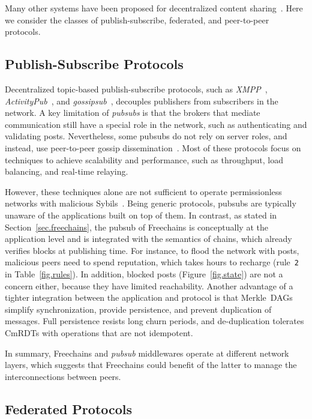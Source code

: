 \documentclass[12pt]{article}
\newcommand{\FC}       {Freechains\xspace}
\newcommand{\code}[1]  {\texttt{\footnotesize{#1}}}
\begin{document}
Many other systems have been proposed for decentralized content
sharing~\cite{p2p.survey,p2p.ecosystem}.
Here we consider the classes of publish-subscribe, federated, and peer-to-peer
protocols.

\subsection{Publish-Subscribe Protocols}

Decentralized topic-based publish-subscribe protocols, such as
    \emph{XMPP}~\cite{pubsub.xmpp},
    \emph{ActivityPub}~\cite{pubsub.activitypub}, and
    \emph{gossipsub}~\cite{pubsub.gossipsub},
decouples publishers from subscribers in the network.
%
A key limitation of \emph{pubsubs} is that the brokers that mediate
communication still have a special role in the network, such as authenticating
and validating posts.
%
Nevertheless, some pubsubs do not rely on server roles, and instead, use
peer-to-peer gossip dissemination~\cite{pubsub.tera,pubsub.rappel,pubsub.stan,pubsub.vitis,pubsub.gossipsub,pubsub.rappel}.
Most of these protocols focus on techniques to achieve scalability and
performance, such as throughput, load balancing, and real-time relaying.

However, these techniques alone are not sufficient to operate permissionless
networks with malicious Sybils~\cite{pubsub.gossipsub2}.
Being generic protocols, pubsubs are typically unaware of the applications
built on top of them.
%
In contrast, as stated in Section~\ref{sec.freechains}, the pubsub of \FC is
conceptually at the application level and is integrated with the semantics of
chains, which already verifies blocks at publishing time.
For instance, to flood the network with posts, malicious peers need to spend
reputation, which takes hours to recharge (rule~\code{2} in
Table~\ref{fig.rules}).
In addition, blocked posts (Figure~\ref{fig.state}) are not a concern either,
because they have limited reachability.
Another advantage of a tighter integration between the application and protocol
is that Merkle~DAGs simplify synchronization, provide persistence, and prevent
duplication of messages.
Full persistence resists long churn periods, and de-duplication tolerates
CmRDTs with operations that are not idempotent.

In summary, \FC and \emph{pubsub} middlewares operate at different network
layers, which suggests that \FC could benefit of the latter to manage the
interconnections between peers.

\subsection{Federated Protocols}
\end{document}
